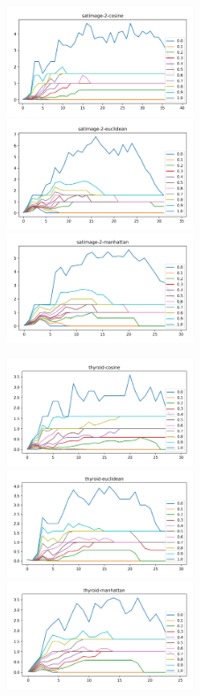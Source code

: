 \begin{figure}[!t]
\centering
\includegraphics[width=2.2in]{kdd/static/lfd_vs_depth/satimage-2-cosine.png}
\includegraphics[width=2.2in]{kdd/static/lfd_vs_depth/satimage-2-euclidean.png}
\includegraphics[width=2.2in]{kdd/static/lfd_vs_depth/satimage-2-manhattan.png}

\includegraphics[width=2.2in]{kdd/static/lfd_vs_depth/thyroid-cosine.png}
\includegraphics[width=2.2in]{kdd/static/lfd_vs_depth/thyroid-euclidean.png}
\includegraphics[width=2.2in]{kdd/static/lfd_vs_depth/thyroid-manhattan.png}


\end{figure}
